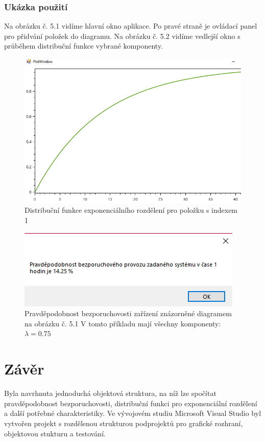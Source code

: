 \documentclass[FM,RP]{tulthesis}
\begin{document}
    \subsection*{Ukázka použití}
        Na obrázku č. 5.1 vidíme hlavní okno aplikace. Po pravé straně je ovládací panel pro přidvání položek do diagramu.
        Na obrázku č. 5.2 vidíme vedlejší okno s průběhem distribuční funkce vybrané komponenty.
    \begin{figure}[h]
        \centering
        \includegraphics[scale=0.50]{pic/oxy.png}
        \caption{Distribuční funkce exponenciálního rozdělení pro položku s indexem 1} 
    \end{figure}
    \begin{figure}[h]
        \centering
        \includegraphics[scale=0.8]{pic/hlaska.png}
        \caption{Pravděpodobnost bezporuchovosti zařízení znázorněné diagramem na obrázku č. 5.1 V tomto příkladu mají všechny komponenty: $ \lambda = 0.75 $} 
    \end{figure}


\chapter{Závěr}

    Byla navrhnuta jednoduchá objektová struktura, na níž lze spočítat pravděpodobnost bezporuchovosti, 
    distribuční funkci pro exponenciální rozdělení a další potřebné charakteristiky.
    Ve vývojovém studiu Microsoft Visual Studio byl vytvořen projekt s rozdělenou strukturou podprojektů pro grafické rozhraní, objektovou stukturu a testování.
\end{document}
